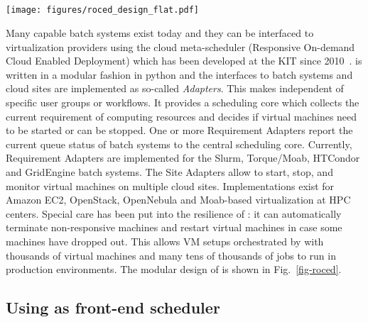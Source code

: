 \subsection{\Roced}
\begin{figure*}
\begin{center}
  \texttt{[image: figures/roced\_design\_flat.pdf]}
  \caption{Overview of the \Roced modular design. The  \Roced Core contains the Broker which decides when and on which sites new virtual machines are booted. The Requirement Adapters report about the utilization and resource requirements of the attached batch systems. The Site Adapter is responsible to manage the lifetime of virtual machines on a cloud site and the Integration Adapters ensure that newly booted machines are integrated into the batch system.}
  \label{fig-roced}
\end{center}
\end{figure*}

Many capable batch systems exist today and they can be interfaced to virtualization providers using the cloud meta-scheduler \Roced (Responsive On-demand Cloud Enabled Deployment) which has been developed at the KIT since 2010~\cite{ROCED}. \Roced is written in a modular
fashion in python and the interfaces to batch systems and cloud sites
are implemented as so-called \textit{Adapters}. This makes \Roced
independent of specific user groups or workflows. It provides a
scheduling core which collects the current requirement of computing
resources and decides if virtual machines need to be started or can be
stopped. One or more Requirement Adapters report the current queue
status of batch systems to the central scheduling core. Currently,
Requirement Adapters are implemented for the Slurm, Torque/Moab, HTCondor
and GridEngine batch systems. The Site Adapters allow \Roced to start,
stop, and monitor virtual machines on multiple cloud
sites. Implementations exist for Amazon EC2, OpenStack, OpenNebula and
Moab-based virtualization at HPC centers. Special care has been put
into the resilience of \Roced: it can automatically terminate
non-responsive machines and restart virtual machines in case some
machines have dropped out. This allows VM setups orchestrated by \Roced with thousands of virtual machines and many tens of thousands of jobs to run in production environments.
The modular design of \Roced is shown in Fig.~\ref{fig-roced}.

\subsection{Using \HTCondor as front-end scheduler}\label{sec:ROCED:HTCondor}


